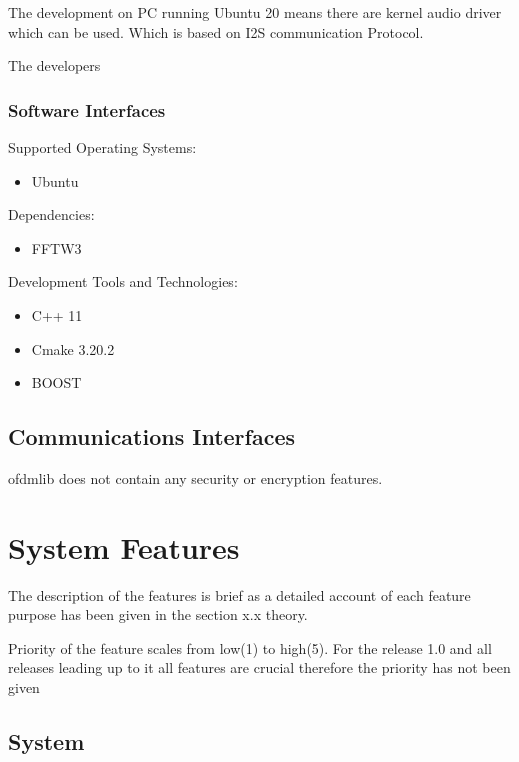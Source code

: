 \documentclass[]{report}
\begin{document}
The development on PC running Ubuntu 20 means there are kernel audio driver which can be used. Which is based on I2S communication Protocol.

The developers 

\subsubsection{Software Interfaces}


Supported Operating Systems:

\begin{itemize}
	\item Ubuntu
\end{itemize}

Dependencies:

\begin{itemize}
	\item FFTW3
\end{itemize}\textbf{}

Development Tools and Technologies:
\begin{itemize}
	\item C++ 11
	\item Cmake 3.20.2
	\item BOOST
\end{itemize}\textbf{}


\subsection{Communications Interfaces}

ofdmlib does not contain any security or encryption features.

\setlength{\parindent}{0em}
\setlength{\parskip}{1em}

\pagebreak
\section{System Features}

The description of the features is brief as a detailed account of each feature purpose has been given in the section x.x theory.

Priority of the feature scales from low(1) to high(5).
For the release 1.0 and all releases leading up to it all features are crucial therefore the priority has not been given

\subsection{System}
\end{document}
